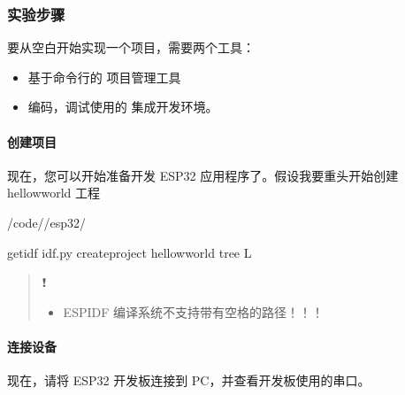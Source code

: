 \documentclass[a4paper,12pt,english]{sphinxmanual}
\begin{document}
\sphinxAtStartPar
{}


\subsubsection{实验步骤}
\label{\detokenize{exp-esp32/ide/esp-idf-clion-dev:id4}}
\sphinxAtStartPar
要从空白开始实现一个项目，需要两个工具：
\begin{itemize}
\item {} 
\sphinxAtStartPar
基于命令行的  项目管理工具

\item {} 
\sphinxAtStartPar
编码，调试使用的  集成开发环境。

\end{itemize}


\paragraph{创建项目}
\label{\detokenize{exp-esp32/ide/esp-idf-clion-dev:id5}}
\sphinxAtStartPar
现在，您可以开始准备开发 ESP32 应用程序了。假设我要重头开始创建 hellow\sphinxhyphen{}world 工程

\begin{sphinxVerbatim}[commandchars=\\\{\}]
 \PYGZti{}/code//esp32/

get\PYGZhy{}idf
idf.py create\PYGZhy{}project hellow\PYGZhy{}world
tree \PYGZhy{}L 
\end{sphinxVerbatim}
\begin{quote}

\sphinxAtStartPar
❗
\begin{itemize}
\item {} 
\sphinxAtStartPar
ESP\sphinxhyphen{}IDF 编译系统不支持带有空格的路径！！！

\end{itemize}
\end{quote}


\paragraph{连接设备}
\label{\detokenize{exp-esp32/ide/esp-idf-clion-dev:id6}}
\sphinxAtStartPar
现在，请将 ESP32 开发板连接到 PC，并查看开发板使用的串口。
\end{document}
